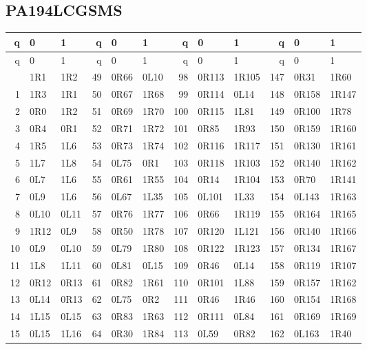 \subsection{PA194LCGSMS}
\begingroup\footnotesize\ttfamily\setlength{\tabcolsep}{4pt}\renewcommand{\arraystretch}{0.94}
\begin{longtable}{rll@{\hspace{1.3em}}rll@{\hspace{1.3em}}rll@{\hspace{1.3em}}rll}
\toprule q & 0 & 1 & q & 0 & 1 & q & 0 & 1 & q & 0 & 1\\\midrule\endfirsthead
\toprule q & 0 & 1 & q & 0 & 1 & q & 0 & 1 & q & 0 & 1\\\midrule\endhead
\bottomrule\endfoot
0 & 1R1 & 1R2 & 49 & 0R66 & 0L10 & 98 & 0R113 & 1R105 & 147 & 0R31 & 1R60\\
1 & 1R3 & 1R1 & 50 & 0R67 & 1R68 & 99 & 0R114 & 0L14 & 148 & 0R158 & 1R147\\
2 & 0R0 & 1R2 & 51 & 0R69 & 1R70 & 100 & 0R115 & 1L81 & 149 & 0R100 & 1R78\\
3 & 0R4 & 0R1 & 52 & 0R71 & 1R72 & 101 & 0R85 & 1R93 & 150 & 0R159 & 1R160\\
4 & 1R5 & 1L6 & 53 & 0R73 & 1R74 & 102 & 0R116 & 1R117 & 151 & 0R130 & 1R161\\
5 & 1L7 & 1L8 & 54 & 0L75 & 0R1 & 103 & 0R118 & 1R103 & 152 & 0R140 & 1R162\\
6 & 0L7 & 1L6 & 55 & 0R61 & 1R55 & 104 & 0R14 & 1R104 & 153 & 0R70 & 1R141\\
7 & 0L9 & 1L6 & 56 & 0L67 & 1L35 & 105 & 0L101 & 1L33 & 154 & 0L143 & 1R163\\
8 & 0L10 & 0L11 & 57 & 0R76 & 1R77 & 106 & 0R66 & 1R119 & 155 & 0R164 & 1R165\\
9 & 1R12 & 0L9 & 58 & 0R50 & 1R78 & 107 & 0R120 & 1L121 & 156 & 0R140 & 1R166\\
10 & 0L9 & 0L10 & 59 & 0L79 & 1R80 & 108 & 0R122 & 1R123 & 157 & 0R134 & 1R167\\
11 & 1L8 & 1L11 & 60 & 0L81 & 0L15 & 109 & 0R46 & 0L14 & 158 & 0R119 & 1R107\\
12 & 0R12 & 0R13 & 61 & 0R82 & 1R61 & 110 & 0R101 & 1L88 & 159 & 0R157 & 1R162\\
13 & 0L14 & 0R13 & 62 & 0L75 & 0R2 & 111 & 0R46 & 1R46 & 160 & 0R154 & 1R168\\
14 & 1L15 & 0L15 & 63 & 0R83 & 1R63 & 112 & 0R111 & 0L84 & 161 & 0R169 & 1R169\\
15 & 0L15 & 1L16 & 64 & 0R30 & 1R84 & 113 & 0L59 & 0R82 & 162 & 0L163 & 1R40\\

\end{longtable}
